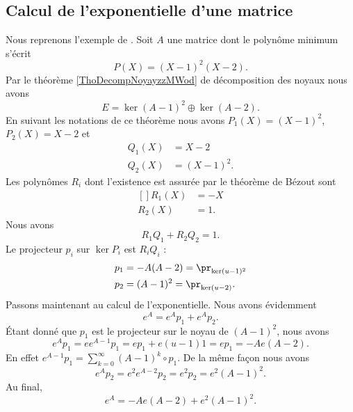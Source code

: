 \subsection{Calcul de l'exponentielle d'une matrice}

Nous reprenons l'exemple de \cite{MneimneReduct}. Soit \( A\) une matrice dont le polynôme minimum s'écrit
\begin{equation}
    P(X)=(X-1)^2(X-2).
\end{equation}
Par le théorème \ref{ThoDecompNoyayzzMWod} de décomposition des noyaux nous avons
\begin{equation}
    E=\ker(A-1)^2\oplus\ker(A-2).
\end{equation}
En suivant les notations de ce théorème nous avons \( P_1(X)=(X-1)^2\), \( P_2(X)=X-2\) et
\begin{subequations}
    \begin{align}
        Q_1(X)&=X-2\\
        Q_2(X)&=(X-1)^2.
    \end{align}
\end{subequations}
Les polynômes \( R_i\) dont l'existence est assurée par le théorème de Bézout sont
\begin{equation}
    \begin{aligned}[]
        R_1(X)&=-X\\
        R_2(X)&=1.
    \end{aligned}
\end{equation}
Nous avons
\begin{equation}
    R_1Q_1+R_2Q_2=1.
\end{equation}
Le projecteur \( p_i\) sur \( \ker P_i\) est \( R_iQ_i\) :
\begin{equation}
    \begin{aligned}[]
        p_1&=-A(A-2)=\pr_{\ker(u-1)^2}\\
        p_2&=(A-1)^2=\pr_{\ker(u-2)}.
    \end{aligned}
\end{equation}
Passons maintenant au calcul de l'exponentielle. Nous avons évidemment
\begin{equation}
    e^A=e^Ap_1+e^Ap_2.
\end{equation}
Étant donné que \( p_1\) est le projecteur sur le noyau de \( (A-1)^2\), nous avons
\begin{equation}
    e^Ap_1=ee^{A-1}p_1=ep_1+e(u-1)1=ep_1=-Ae(A-2).
\end{equation}
En effet \( e^{A-1}p_1=\sum_{k=0}^{\infty}(A-1)^k\circ p_1\). De la même façon nous avons
\begin{equation}
    e^Ap_2=e^2e^{A-2}p_2=e^2p_2=e^2(A-1)^2.
\end{equation}
Au final,
\begin{equation}
    e^A=-Ae(A-2)+e^2(A-1)^2.
\end{equation}

